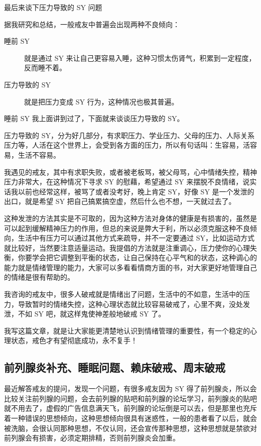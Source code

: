 \documentclass{ctexart}
\begin{document}
最后来谈下压力导致的 SY 问题

据我研究和总结，一般戒友中普遍会出现两种不良倾向：

\begin{description}
    \item[睡前 SY] 就是通过 SY 来让自己更容易入睡，这种习惯太伤肾气，积累到一定程度，反而睡不着。
    \item[压力导致的 SY] 就是把压力变成 SY 行为，这种情况也极其普遍。
\end{description}

睡前 SY 我上面讲到过了，下面就来谈谈压力导致的 SY。

压力导致的 SY，分为好几部分，有求职压力、学业压力、父母的压力、人际关系压力等，人活在这个世界上，会受到各方面的压力，所以有句话叫：生容易，活容易，生活不容易。

我遇见的戒友，其中有求职失败，或者被老板骂，被父母骂，心中情绪失控，精神压力非常大，在这种情况下寻求 SY 的慰藉，希望通过 SY 来摆脱不良情绪，说实话我以前也经常这样，被骂了或者没考好，晚上肯定 SY，好像 SY 是一个发泄的出口，就是希望 SY 把自己搞累搞空虚，然后什么也不想，一天就过去了。

这种发泄的方法其实是不可取的，因为这种方法对身体的健康是有损害的，虽然是可以起到缓解精神压力的作用，但总的来说是弊大于利，所以必须克服这种不良倾向，生活中有压力可以通过其他方式来疏导，并不一定要通过 SY，比如运动方式就比较好，当然要注意适量运动。我提倡的方法就是注重调心，压力使你的心理失衡，你要学会把它调整到平衡的状态，让自己保持在心平气和的状态，这种调心的能力就是情绪管理的能力，大家可以多看看情商方面的书，对大家更好地管理自己的情绪是很有帮助的。

我咨询的戒友中，很多人破戒就是情绪出了问题，生活中的不如意，生活中的压力，导致暂时的情绪失控，这种心理状态就比较容易破戒了，心里不爽，没处发泄，不如 SY 吧，就这样鬼使神差般地破戒 SY 了。

我写这篇文章，就是让大家能更清楚地认识到情绪管理的重要性，有一个稳定的心理状态，戒色才有望彻底成功，永不复手！

\subsection{前列腺炎补充、睡眠问题、赖床破戒、周末破戒}

最近解答戒友的提问，发现一个问题，有很多戒友因为 SY 得了前列腺炎，所以会比较关注前列腺的问题，会去前列腺的贴吧和前列腺的论坛学习，前列腺炎的贴吧就不用去了，虚假的广告信息满天飞，前列腺的论坛倒是可以去，但是那里也充斥着一种错误的思想倾向，这种思想倾向很具有迷惑性，一般的患者看了以后，就会被洗脑，会很认同那种思想，不仅认同，还会宣传那种思想，这种思想就是禁欲对前列腺会有损害，必须定期排精，否则前列腺炎会加重。
\end{document}
